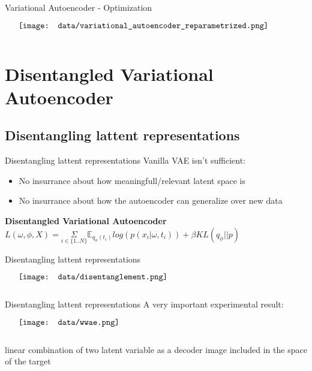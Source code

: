\documentclass{beamer}
\begin{document}
\begin{frame}{Variational Autoencoder - Optimization}
    \begin{minipage}{5in}
    \centering
    $\vcenter{
    \texttt{[image: data/variational\_autoencoder\_reparametrized.png]} \\
    }$
    \end{minipage}
\end{frame}

\section{Disentangled Variational Autoencoder}
\subsection{Disentangling lattent representations}
\begin{frame}{Disentangling lattent representations}
	Vanilla VAE isn't sufficient:
	\begin{itemize}
		\item No insurrance about how meaningfull/relevant latent space is 
		\item No insurrance about how the autoencoder can generalize over new data 
	\end{itemize}
    \bf{Disentangled Variational Autoencoder}
	$ L(\omega, \phi, X)= \underset{i \in \{1..N\}}{\Sigma} \mathbb{E}_{q_\phi(t_i)} log( p(x_i | \omega, t_i)) + \beta KL( q_\phi || p ) $
\end{frame}

\begin{frame}{Disentangling lattent representations}
    \begin{minipage}{5in}
    \centering
    $\vcenter{
    \texttt{[image: data/disentanglement.png]} \\
    }$
    \end{minipage}
\end{frame}


\begin{frame}{Disentangling lattent representations}
    A very important experimental result: \\
    \begin{minipage}{5in}
    \centering
    $\vcenter{
    \texttt{[image: data/wwae.png]} \\
    }$
    \end{minipage}
    linear combination of two latent variable as a decoder image included in the space of the target 
\end{frame}
\end{document}
